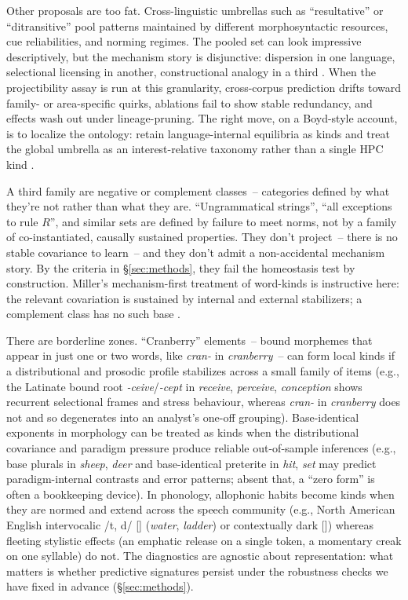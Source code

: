\documentclass[12pt]{article}
\begin{document}
Other proposals are too fat. Cross-linguistic umbrellas such as \enquote{resultative} or \enquote{ditransitive} pool patterns maintained by different morphosyntactic resources, cue reliabilities, and norming regimes. The pooled set can look impressive descriptively, but the mechanism story is disjunctive: dispersion in one language, selectional licensing in another, constructional analogy in a third \citep{Croft2001,Haspelmath2010}. When the projectibility assay is run at this granularity, cross-corpus prediction drifts toward family- or area-specific quirks, ablations fail to show stable redundancy, and effects wash out under lineage-pruning. The right move, on a Boyd-style account, is to localize the ontology: retain language-internal equilibria as kinds and treat the global umbrella as an interest-relative taxonomy rather than a single \textsc{HPC} kind \citep{Boyd1991Enthusiasm,Boyd1999Homeostasis}.

A third family are negative or complement classes~-- categories defined by what they're not rather than what they are. \enquote{Ungrammatical strings}, \enquote{all exceptions to rule $R$}, and similar sets are defined by failure to meet norms, not by a family of co-instantiated, causally sustained properties. They don't project~-- there is no stable covariance to learn~-- and they don't admit a non-accidental mechanism story. By the criteria in \S\ref{sec:methods}, they fail the homeostasis test by construction. Miller’s mechanism-first treatment of word-kinds is instructive here: the relevant covariation is sustained by internal and external stabilizers; a complement class has no such base \citep{Miller2021WordsSpeciesKinds}.

There are borderline zones. \enquote{Cranberry} elements~-- bound morphemes that appear in just one or two words, like \textit{cran-} in \textit{cranberry}~-- can form local kinds if a distributional and prosodic profile stabilizes across a small family of items (e.g., the Latinate bound root \textit{-ceive}/\textit{-cept} in \textit{receive}, \textit{perceive}, \textit{conception} shows recurrent selectional frames and stress behaviour, whereas \textit{cran-} in \textit{cranberry} does not and so degenerates into an analyst’s one-off grouping). Base-identical exponents in morphology can be treated as kinds when the distributional covariance and paradigm pressure produce reliable out-of-sample inferences (e.g., base plurals in \textit{sheep}, \textit{deer} and base-identical preterite in \textit{hit}, \textit{set} may predict paradigm-internal contrasts and error patterns; absent that, a \enquote{zero form} is often a bookkeeping device). In phonology, allophonic habits become kinds when they are normed and extend across the speech community (e.g., North American English intervocalic /t, d/ \textrightarrow{} [] (\textit{water}, \textit{ladder}) or contextually dark [\textltilde]) whereas fleeting stylistic effects (an emphatic release on a single token, a momentary creak on one syllable) do not. The diagnostics are agnostic about representation: what matters is whether predictive signatures persist under the robustness checks we have fixed in advance (\S\ref{sec:methods}).
\end{document}
